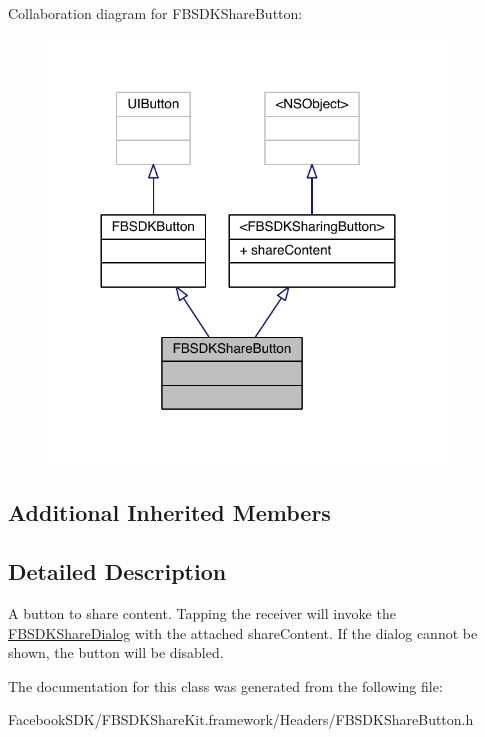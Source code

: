 Collaboration diagram for F\-B\-S\-D\-K\-Share\-Button\-:
\nopagebreak
\begin{figure}[H]
\begin{center}
\leavevmode
\includegraphics[width=300pt]{interface_f_b_s_d_k_share_button__coll__graph}
\end{center}
\end{figure}
\subsection*{Additional Inherited Members}


\subsection{Detailed Description}
A button to share content.  Tapping the receiver will invoke the \hyperlink{interface_f_b_s_d_k_share_dialog}{F\-B\-S\-D\-K\-Share\-Dialog} with the attached share\-Content. If the dialog cannot be shown, the button will be disabled. 

The documentation for this class was generated from the following file\-:\begin{DoxyCompactItemize}
\item 
Facebook\-S\-D\-K/\-F\-B\-S\-D\-K\-Share\-Kit.\-framework/\-Headers/F\-B\-S\-D\-K\-Share\-Button.\-h\end{DoxyCompactItemize}
